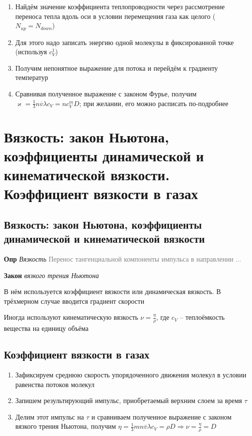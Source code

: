 \documentclass[a4paper, 14pt]{article}
\begin{document}
    \begin{enumerate}
        \item Найдём значение коэффициента теплопроводности через рассмотрение переноса тепла вдоль оси в условии
        перемещения газа как целого ($N_{up} = N_{down}$)
        \item Для этого надо записать энергию одной молекулы в фиксированной точке (используя $c^1_V$)
        \item Получим непонятное выражение для потока и перейдём к градиенту температур
        \item Сравнивая полученное выражение с законом Фурье, получим $\varkappa = \frac{1}{3} n \overline{v} \lambda
        c_V = n c^m_V D$; при желании, его можно расписать по-подробнее
    \end{enumerate}
    
    \section{Вязкость: закон Ньютона, коэффициенты динамической и кинематической вязкости.
    Коэффициент вязкости в газах}
    
    \subsection{Вязкость: закон Ньютона, коэффициенты динамической и кинематической вязкости}
    
    \textbf{Опр} \textit{Вязкость} \textcolor{gray}{Перенос тангенциальной компоненты импульса в направлении ...}
    
    \textbf{Закон} \textit{вязкого трения Ньютона}
    
    В нём используется коэффициент вязкости или динамическая вязкость.
    В трёхмерном случае вводится градиент скорости
    
    Иногда используют кинематическую вязкость $\nu = \frac{\eta}{\rho}$, где $c_V$ -- теплоёмкость вещества на
    единицу объёма
    
    \subsection{Коэффициент вязкости в газах}
    
    \begin{enumerate}
        \item Зафиксируем среднюю скорость упорядоченного движения молекул в условии равенства потоков молекул
        \item Запишем результирующий импульс, приобретаемый верхним слоем за время $\tau$
        \item Делим этот импульс на $\tau$ и сравниваем полученное выражение с законом вязкого трения Ньютона,
        получим $\eta = \frac{1}{3} mn \overline{v} \lambda c_V = \rho D \Rightarrow \nu = \frac{\eta}{\rho} = D$
    \end{enumerate}
    
\end{document}
